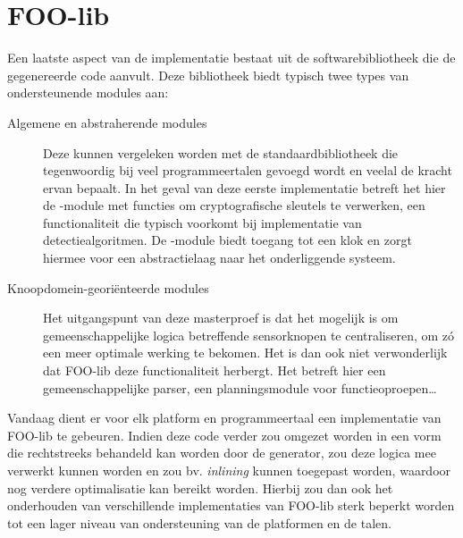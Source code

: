 
\section{FOO-lib}
\label{section:devel-foo-lib}

Een laatste aspect van de implementatie bestaat uit de softwarebibliotheek die
de gegenereerde code aanvult. Deze bibliotheek biedt typisch twee types van
ondersteunende modules aan:

\begin{description}

\item[Algemene en abstraherende modules] Deze kunnen vergeleken worden met de
standaardbibliotheek die tegenwoordig bij veel programmeertalen gevoegd wordt
en veelal de kracht ervan bepaalt. In het geval van deze eerste implementatie
betreft het hier de -module met functies om cryptografische
sleutels te verwerken, een functionaliteit die typisch voorkomt bij
implementatie van detectiealgoritmen. De -module biedt toegang tot
een klok en zorgt hiermee voor een abstractielaag naar het onderliggende
systeem.

\item[Knoopdomein-geori\"enteerde modules] Het uitgangspunt van deze
masterproef is dat het mogelijk is om gemeenschappelijke logica betreffende
sensorknopen te centraliseren, om z\'o een meer optimale werking te bekomen.
Het is dan ook niet verwonderlijk dat FOO-lib deze functionaliteit herbergt.
Het betreft hier een gemeenschappelijke parser, een planningsmodule voor
functieoproepen\dots

\end{description}

Vandaag dient er voor elk platform en programmeertaal een implementatie van
FOO-lib te gebeuren. Indien deze code verder zou omgezet worden in een vorm die
rechtstreeks behandeld kan worden door de generator, zou deze logica mee
verwerkt kunnen worden en zou bv. \emph{inlining} kunnen toegepast worden,
waardoor nog verdere optimalisatie kan bereikt worden. Hierbij zou dan ook het
onderhouden van verschillende implementaties van FOO-lib sterk beperkt worden
tot een lager niveau van ondersteuning van de platformen en de talen.

